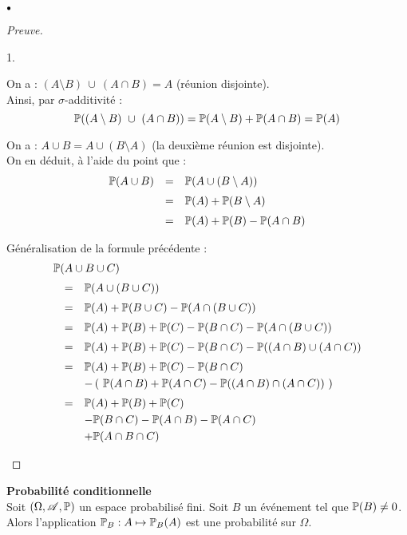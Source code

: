 \documentclass[11pt]{article}%
\begin{document}
\begin{noliste}{$\scriptstyle \bullet$}
\begin{proof}[Preuve]
\begin{noliste}{1.}
\item On a : $(A \setminus B) \ \cup \ (A \cap B) = A$ (réunion
    disjointe).\\
    Ainsi, par $\sigma$-additivité :
    \[
    \mathbb{P}((A \setminus B) \ \cup \ (A \cap B)) = \mathbb{P}(A \setminus B)
    + \mathbb{P}(A \cap B) = \mathbb{P}(A)
    \]
\item On a : $A \cup B = A \cup (B \setminus A)$ (la deuxième
    réunion est disjointe).\\
    On en déduit, à l'aide du point  que :
    \[
    \begin{array}{rcl}
      \mathbb{P}(A \cup B) & = & \mathbb{P}(A \cup (B \setminus A)) \\[.2cm]
      & = & \mathbb{P}(A) + \mathbb{P}(B \setminus A) \\[.2cm]
      & = & \mathbb{P}(A) + \mathbb{P}(B) - \mathbb{P}(A \cap B)
    \end{array}
    \]    

  \item Généralisation de la formule précédente :
    \[
    \begin{array}{rcl}
      \multicolumn{3}{l}{\Prob(A \cup B \cup C)} \\[.2cm]
      & = & \Prob(A \cup (B \cup C)) \\[.2cm]
      & = & \Prob(A) + \Prob(B \cup C) - \Prob(A \cap (B \cup C)) 
\\[.2cm]
      & = & \Prob(A) + \Prob(B) + \Prob(C) - \Prob(B \cap C) - 
      \Prob(A \cap (B \cup C)) \\[.2cm]
      & = & \Prob(A) + \Prob(B) + \Prob(C) - \Prob(B \cap C) - 
      \Prob((A \cap B) \cup (A \cap C)) \\[.2cm]
      & = & \Prob(A) + \Prob(B) + \Prob(C) - \Prob(B \cap C) \\[.1cm]
      & & - \left( \ \Prob(A \cap B) + \Prob(A \cap C) - \Prob((A \cap 
B) \cap 
        (A \cap C)) \ \right)\\[.2cm]
      & = & \Prob(A) + \Prob(B) + \Prob(C) \\[.1cm]
      & & - \Prob(B \cap C) - \Prob(A \cap B) - \Prob(A \cap C) \\[.1cm]
      & & + \Prob(A \cap B \cap C)
    \end{array}
    \]
\end{noliste}
\end{proof}

\item {\bf Probabilité conditionnelle}\\
Soit $(\Omega,\mathscr{A},\mathbb{P})$ un espace probabilisé fini. Soit $B$ un 
événement tel que $\mathbb{P}(B) \neq 0$. Alors l'application $\mathbb{P}_B: A 
\mapsto \mathbb{P}_B(A)$ est une probabilité sur $\Omega$.


\end{noliste}
\end{document}

